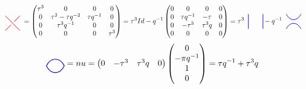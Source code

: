 \documentclass{amsart}
\newcommand{\hackcenter}[1]{
 \xy (0,0)*{#1}; \endxy}
\theoremstyle{plain}
\theoremstyle{definition}
\theoremstyle{definition}
\numberwithin{equation}{section}
\numberwithin{theorem}{section}
\numberwithin{equation}{section}
\begin{document}
\begin{align*}
\hackcenter{ \begin{tikzpicture} [xscale=-1,scale=.75]
\draw[thick, red, -] (0,0) to (1,1);
\draw[thick, red, -] (1,0) to (.6,.4);
\draw[thick, red, -] (0,1) to (.4,.6);
\end{tikzpicture}} \;=
  \begin{pmatrix}
\tau^3 & 0 & 0 & 0 \\
0 & \tau^3-\tau q^{-2} & \tau q^{-1} & 0 \\
0 & \tau^3q^{-1} & 0 & 0 \\
0 & 0 & 0 & \tau^3
\end{pmatrix}&=
\tau^3 Id- q^{-1}
\begin{pmatrix}
  0 & 0 & 0 & 0 \\
  0 & \tau q^{-1} & -\tau & 0 \\
  0 & -\tau^3 & \tau^3 q  & 0 \\
  0 & 0 & 0 & 0
\end{pmatrix}
=
\tau^3\;\;
\hackcenter{ \begin{tikzpicture} [scale=.75]
\draw[thick,   blue] (0,0) to (0,1);
\draw[thick,   blue] (1,0) to (1,1);
\end{tikzpicture}}
-q^{-1}\;\;
\hackcenter{ \begin{tikzpicture} [scale=.75]
\draw[thick,   blue] (0,0).. controls ++(.25,.5) and ++(-.25,.5).. (1,0);
\draw[thick,   blue] (0,1).. controls ++(.25,-.5) and ++(-.25,-.5).. (1,1);
\end{tikzpicture}}
\end{align*}
\begin{align*}
   \hackcenter{ \begin{tikzpicture} [scale=.75]
\draw[thick,   blue] (0,0).. controls ++(.25,.5) and ++(-.25,.5).. (1,0);
\draw[thick,   blue] (0,0).. controls ++(.25,-.5) and ++(-.25,-.5).. (1,0);
\end{tikzpicture}} &=nu=
\begin{pmatrix}
     0 & -\tau^3 & \tau^3q & 0
  \end{pmatrix}
\begin{pmatrix}
     0\\
     -\pi q^{-1}\\
     1 \\
     0
  \end{pmatrix}=\tau q^{-1}+\tau^3 q
\end{align*}
\end{document}
